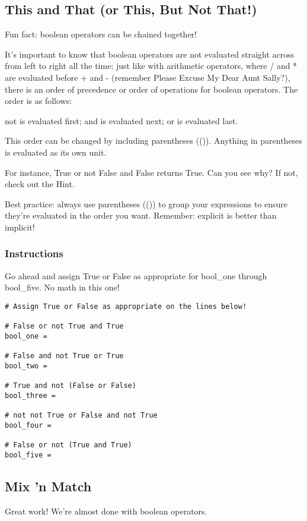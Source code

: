 \documentclass[12pt,a4paper,final,twoside,onecolumn,titlepage]{book}
\begin{document}
\subsection{This and That (or This, But Not That!)}

Fun fact: boolean operators can be chained together!

It's important to know that boolean operators are not evaluated straight across from left to right all the time; just like with arithmetic operators, where / and * are evaluated before + and - (remember Please Excuse My Dear Aunt Sally?), there is an order of precedence or order of operations for boolean operators. The order is as follows:

    not is evaluated first;
    and is evaluated next;
    or is evaluated last.

This order can be changed by including parentheses (()). Anything in parentheses is evaluated as its own unit.

For instance, True or not False and False returns True. Can you see why? If not, check out the Hint.

Best practice: always use parentheses (()) to group your expressions to ensure they're evaluated in the order you want. Remember: explicit is better than implicit!

\subsubsection{Instructions}

Go ahead and assign True or False as appropriate for bool\_one through bool\_five. No math in this one!

\begin{lstlisting}
# Assign True or False as appropriate on the lines below!

# False or not True and True
bool_one = 

# False and not True or True
bool_two = 

# True and not (False or False)
bool_three = 

# not not True or False and not True
bool_four = 

# False or not (True and True)
bool_five = 
\end{lstlisting}

\subsection{Mix 'n Match}

Great work! We're almost done with boolean operators.
\end{document}

